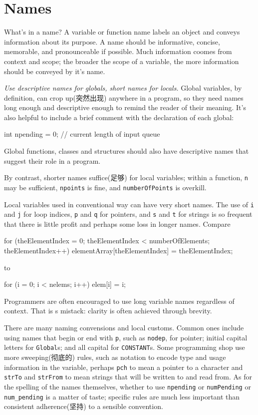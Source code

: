 \section{Names}
\label{sec:names}
What's in a name? A variable or function name labels an object and conveys
information about its purpose. A name should be informative, concise,
memorable, and pronounceable if possible. Much information coomes from
context and scope; the broader the scope of a variable, the more
information should be conveyed by it's name.

\emph{Use descriptive names for globals, short names for locals.} Global
variables, by definition, can crop up(突然出现) anywhere in a program, so
they need names long enough and descriptive enough to remind the reader of
their meaning. It's also helpful to include a brief comment with the
declaration of each global:
\begin{wellcode}
    int npending = 0;   // current length of input queue
\end{wellcode}
Global functions, classes and structures should also have descriptive names
that suggest their role in a program.

By contrast, shorter names suffice(足够) for local variables; within a
function, \verb"n" may be sufficient, \verb"npoints" is fine, and
\verb"numberOfPoints" is overkill.

Local variables used in conventional way can have very short names. The use
of \verb"i" and \verb"j" for loop indices, \verb"p" and \verb"q" for
pointers, and \verb"s" and \verb"t" for strings is so frequent that there
is little profit and perhaps some loss in longer names. Compare
\begin{badcode}
    for (theElementIndex = 0; theElementIndex < numberOfElements;
            theElementIndex++)
        elementArray[theElementIndex] = theElementIndex;
\end{badcode}
to 
\begin{wellcode}
    for (i = 0; i < nelems; i++)
        elem[i] = i;
\end{wellcode}
Programmers are often encouraged to use long variable names regardless of
context. That is s mistack: clarity is often achieved through brevity.

There are many naming convensions and local customs. Common ones include
using names that begin or end with \verb"p", such as \verb"nodep", for
pointer; initial capital letters for \verb"Global"s; and all capital for
\verb"CONSTANT"s. Some programming shop use more sweeping(彻底的) rules,
such as notation to encode type and usage information in the variable,
perhaps \verb"pch" to mean a pointer to a character and \verb"strTo" and
\verb"strFrom" to mean strings that will be written to and read from. As
for the spelling of the names themselves, whether to use \verb"npending" or
\verb"numPending" or \verb"num_pending" is a matter of taste; specific
rules are much less important than consistent adherence(坚持) to a sensible
convention.

